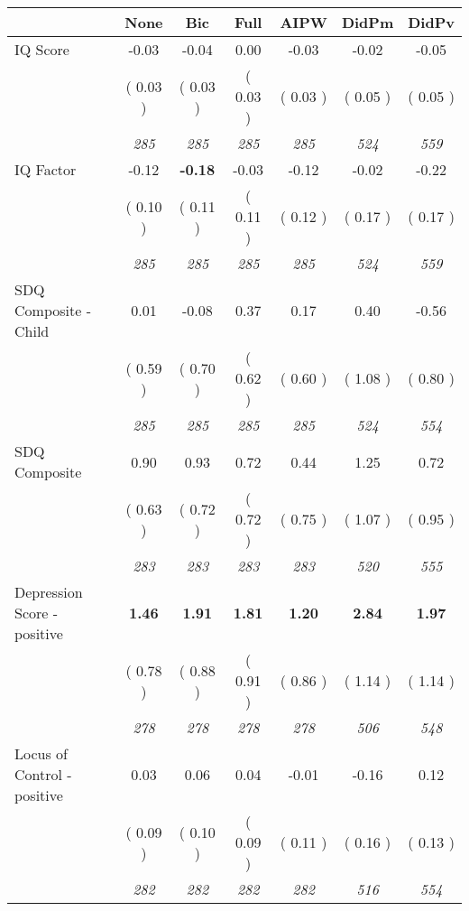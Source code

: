 \begin{tabular}{l c c c c c c}
\toprule
 & None & Bic & Full & AIPW & DidPm & DidPv \\
\midrule
IQ Score &     -0.03 &     -0.04 &      0.00 &     -0.03 &     -0.02 &     -0.05 \\
& (     0.03 ) & (     0.03 ) & (     0.03 ) & (     0.03 ) & (     0.05 ) & (     0.05 ) \\
& \textit{ 285 } & \textit{ 285 } & \textit{ 285 } & \textit{ 285 } & \textit{ 524 } & \textit{ 559 } \\
IQ Factor &     -0.12 & \textbf{     -0.18 } &     -0.03 &     -0.12 &     -0.02 &     -0.22 \\
& (     0.10 ) & (     0.11 ) & (     0.11 ) & (     0.12 ) & (     0.17 ) & (     0.17 ) \\
& \textit{ 285 } & \textit{ 285 } & \textit{ 285 } & \textit{ 285 } & \textit{ 524 } & \textit{ 559 } \\
SDQ Composite - Child &      0.01 &     -0.08 &      0.37 &      0.17 &      0.40 &     -0.56 \\
& (     0.59 ) & (     0.70 ) & (     0.62 ) & (     0.60 ) & (     1.08 ) & (     0.80 ) \\
& \textit{ 285 } & \textit{ 285 } & \textit{ 285 } & \textit{ 285 } & \textit{ 524 } & \textit{ 554 } \\
SDQ Composite &      0.90 &      0.93 &      0.72 &      0.44 &      1.25 &      0.72 \\
& (     0.63 ) & (     0.72 ) & (     0.72 ) & (     0.75 ) & (     1.07 ) & (     0.95 ) \\
& \textit{ 283 } & \textit{ 283 } & \textit{ 283 } & \textit{ 283 } & \textit{ 520 } & \textit{ 555 } \\
Depression Score - positive & \textbf{      1.46 } & \textbf{      1.91 } & \textbf{      1.81 } & \textbf{     1.20} & \textbf{      2.84 } & \textbf{      1.97 } \\
& (     0.78 ) & (     0.88 ) & (     0.91 ) & (     0.86 ) & (     1.14 ) & (     1.14 ) \\
& \textit{ 278 } & \textit{ 278 } & \textit{ 278 } & \textit{ 278 } & \textit{ 506 } & \textit{ 548 } \\
Locus of Control - positive &      0.03 &      0.06 &      0.04 &     -0.01 &     -0.16 &      0.12 \\
& (     0.09 ) & (     0.10 ) & (     0.09 ) & (     0.11 ) & (     0.16 ) & (     0.13 ) \\
& \textit{ 282 } & \textit{ 282 } & \textit{ 282 } & \textit{ 282 } & \textit{ 516 } & \textit{ 554 } \\

\end{tabular}
